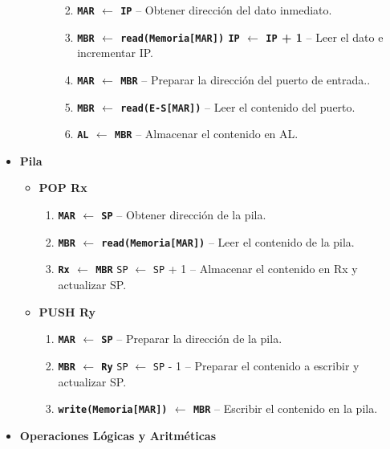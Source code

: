 \documentclass[12pt,oneside]{templates/unerthesis}
\providecommand{\tightlist}{%
  \setlength{\itemsep}{0pt}\setlength{\parskip}{0pt}}
\begin{document}
\begin{itemize}
\begin{itemize}
\begin{itemize}
      \begin{enumerate}
      \def\labelenumi{\arabic{enumi}.}
      \setcounter{enumi}{3}
      \tightlist
      \item
        \textbf{\texttt{MAR} \(\leftarrow\) \texttt{IP}} -- Obtener dirección del dato inmediato.
      \item
        \textbf{\texttt{MBR} \(\leftarrow\) \texttt{read(Memoria{[}MAR{]})} \textbar{} \texttt{IP} \(\leftarrow\) \texttt{IP} + 1} -- Leer el dato e incrementar IP.
      \item
        \textbf{\texttt{MAR} \(\leftarrow\) \texttt{MBR}} -- Preparar la dirección del puerto de entrada..
      \item
        \textbf{\texttt{MBR} \(\leftarrow\) \texttt{read(E-S{[}MAR{]})}} -- Leer el contenido del puerto.
      \item
        \textbf{\texttt{AL} \(\leftarrow\) \texttt{MBR}} -- Almacenar el contenido en AL.
      \end{enumerate}
    \end{itemize}
  \end{itemize}
\item
  \textbf{Pila}

  \begin{itemize}
  \tightlist
  \item
    \textbf{POP Rx}

    \begin{enumerate}
    \def\labelenumi{\arabic{enumi}.}
    \setcounter{enumi}{3}
    \tightlist
    \item
      \textbf{\texttt{MAR} \(\leftarrow\) \texttt{SP}} -- Obtener dirección de la pila.
    \item
      \textbf{\texttt{MBR} \(\leftarrow\) \texttt{read(Memoria{[}MAR{]})}} -- Leer el contenido de la pila.
    \item
      \textbf{\texttt{Rx} \(\leftarrow\) \texttt{MBR}} \textbar{} \texttt{SP} \(\leftarrow\) \texttt{SP} + 1 -- Almacenar el contenido en Rx y actualizar SP.
    \end{enumerate}
  \item
    \textbf{PUSH Ry}

    \begin{enumerate}
    \def\labelenumi{\arabic{enumi}.}
    \setcounter{enumi}{3}
    \tightlist
    \item
      \textbf{\texttt{MAR} \(\leftarrow\) \texttt{SP}} -- Preparar la dirección de la pila.
    \item
      \textbf{\texttt{MBR} \(\leftarrow\) \texttt{Ry}} \textbar{} \texttt{SP} \(\leftarrow\) \texttt{SP} - 1 -- Preparar el contenido a escribir y actualizar SP.
    \item
      \textbf{\texttt{write(Memoria{[}MAR{]})} \(\leftarrow\) \texttt{MBR}} -- Escribir el contenido en la pila.
    \end{enumerate}
  \end{itemize}
\item
  \textbf{Operaciones Lógicas y Aritméticas}


\end{itemize}
\end{document}
